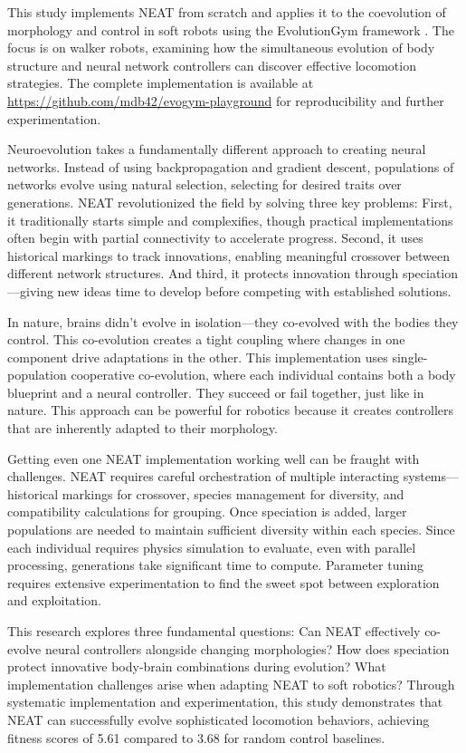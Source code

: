 \documentclass[conference]{IEEEtran}
\begin{document}
This study implements NEAT from scratch and applies it to the coevolution of morphology and control in soft robots using the EvolutionGym framework \cite{evogym2021}. The focus is on walker robots, examining how the simultaneous evolution of body structure and neural network controllers can discover effective locomotion strategies. The complete implementation is available at \url{https://github.com/mdb42/evogym-playground} \cite{branson2025evogym} for reproducibility and further experimentation.

Neuroevolution takes a fundamentally different approach to creating neural networks. Instead of using backpropagation and gradient descent, populations of networks evolve using natural selection, selecting for desired traits over generations. NEAT \cite{stanley2002evolving} revolutionized the field by solving three key problems: First, it traditionally starts simple and complexifies, though practical implementations often begin with partial connectivity to accelerate progress. Second, it uses historical markings to track innovations, enabling meaningful crossover between different network structures. And third, it protects innovation through speciation—giving new ideas time to develop before competing with established solutions.

In nature, brains didn't evolve in isolation—they co-evolved with the bodies they control. This co-evolution creates a tight coupling where changes in one component drive adaptations in the other. This implementation uses single-population cooperative co-evolution, where each individual contains both a body blueprint and a neural controller. They succeed or fail together, just like in nature. This approach can be powerful for robotics because it creates controllers that are inherently adapted to their morphology.

Getting even one NEAT implementation working well can be fraught with challenges. NEAT requires careful orchestration of multiple interacting systems—historical markings for crossover, species management for diversity, and compatibility calculations for grouping. Once speciation is added, larger populations are needed to maintain sufficient diversity within each species. Since each individual requires physics simulation to evaluate, even with parallel processing, generations take significant time to compute. Parameter tuning requires extensive experimentation to find the sweet spot between exploration and exploitation.

This research explores three fundamental questions: Can NEAT effectively co-evolve neural controllers alongside changing morphologies? How does speciation protect innovative body-brain combinations during evolution? What implementation challenges arise when adapting NEAT to soft robotics? Through systematic implementation and experimentation, this study demonstrates that NEAT can successfully evolve sophisticated locomotion behaviors, achieving fitness scores of 5.61 compared to 3.68 for random control baselines.
\end{document}
